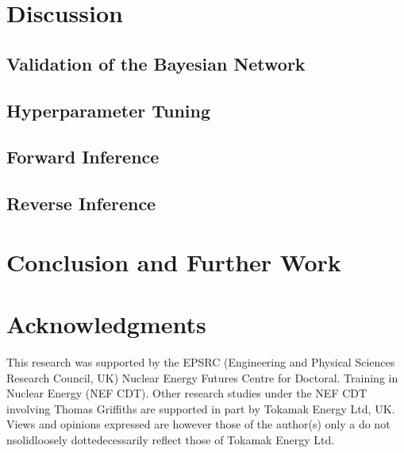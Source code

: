 \documentclass[journal]{IEEEtran}
\begin{document}
\section{Discussion}\label{sec:Discussion}

\subsection{Validation of the Bayesian Network}\label{sec:disc_validation}

\subsection{Hyperparameter Tuning}\label{sec:disc_hyperparameter}

\subsection{Forward Inference}\label{sec:disc_forward}

\subsection{Reverse Inference}\label{sec:disc_reverse}

\section{Conclusion and Further Work}\label{sec:conc}

\section{Acknowledgments}
This research was supported by the EPSRC (Engineering and Physical Sciences Research Council, UK) Nuclear Energy Futures Centre for Doctoral. Training in Nuclear Energy (NEF CDT).  Other research studies under the NEF CDT involving Thomas Griffiths are supported in part by Tokamak Energy Ltd, UK. Views and opinions expressed are however those of the author(s) only a do not nsolidloosely dottedecessarily reflect those of Tokamak Energy Ltd.



\end{document}
